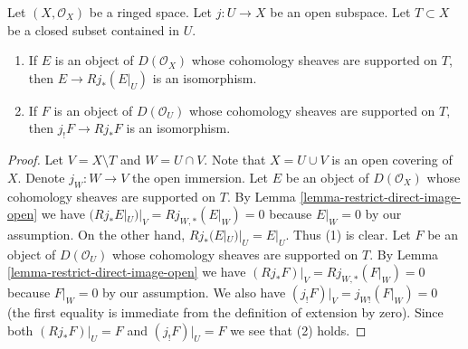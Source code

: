 \begin{lemma}
\label{lemma-pushforward-restriction}
Let $(X, \mathcal{O}_X)$ be a ringed space. Let $j : U \to X$ be an
open subspace. Let $T \subset X$ be a closed subset contained in $U$.
\begin{enumerate}
\item If $E$ is an object of $D(\mathcal{O}_X)$ whose cohomology sheaves
are supported on $T$, then $E \to Rj_*(E|_U)$ is an isomorphism.
\item If $F$ is an object of $D(\mathcal{O}_U)$ whose cohomology sheaves
are supported on $T$, then $j_!F \to Rj_*F$ is an isomorphism.
\end{enumerate}
\end{lemma}

\begin{proof}
Let $V = X \setminus T$ and $W = U \cap V$. Note that $X = U \cup V$ is an
open covering of $X$. Denote $j_W : W \to V$ the open immersion.
Let $E$ be an object of $D(\mathcal{O}_X)$ whose cohomology sheaves are
supported on $T$. By
Lemma \ref{lemma-restrict-direct-image-open} we have
$(Rj_*E|_U)|_V = Rj_{W, *}(E|_W) = 0$ because $E|_W = 0$ by our assumption.
On the other hand, $Rj_*(E|_U)|_U = E|_U$. Thus (1) is clear.
Let $F$ be an object of $D(\mathcal{O}_U)$ whose cohomology sheaves
are supported on $T$. By
Lemma \ref{lemma-restrict-direct-image-open} we have
$(Rj_*F)|_V = Rj_{W, *}(F|_W) = 0$ because $F|_W = 0$ by our assumption.
We also have $(j_!F)|_V = j_{W!}(F|_W) = 0$ (the first equality is immediate
from the definition of extension by zero). Since both
$(Rj_*F)|_U = F$ and $(j_!F)|_U = F$ we see that (2) holds.
\end{proof}
